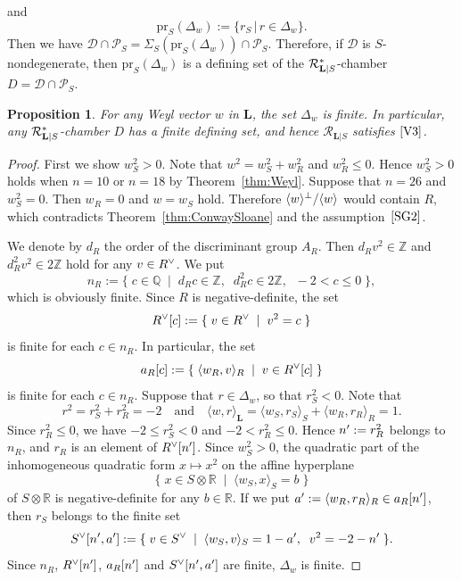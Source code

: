 \documentclass{amsart}
\theoremstyle{plain}
\newtheorem{proposition}[theorem]{Proposition}
\theoremstyle{definition}
\theoremstyle{remark}
\numberwithin{equation}{section}
\numberwithin{table}{section}
\numberwithin{figure}{section}
\newcommand{\Q}{\mathord{\mathbb  Q}}
\newcommand{\R}{\mathord{\mathbb R}}
\newcommand{\Z}{\mathord{\mathbb Z}}
\newcommand{\DDD}{\mathord{\mathcal D}}
\newcommand{\PPP}{\mathord{\mathcal P}}
\newcommand{\RRR}{\mathord{\mathcal R}}
\newcommand{\set}[2]{\{\; {#1} \; \mid \; {#2} \;  \}}
\newcommand{\shortset}[2]{\{ {#1} \,|\, {#2}   \}}
\newcommand{\gen}[1]{\langle {#1}  \rangle}
\newcommand{\tensor}{\otimes}
\newcommand{\sprime}{\sp\prime}
\newcommand{\sperp}{\sp{\perp}}
\newcommand{\dual}{\sp{\vee}}
\newcommand{\pr}{\mathord{\mathrm {pr}}}
\newcommand{\rmand}{\textrm{and}}
\newcommand{\quand}{\quad\rmand\quad}
\renewcommand{\L}{\mathord{\mathbf{L}}}
\newcommand{\intM}[2]{\langle{#1}\rangle_{#2}}
\newcommand{\Roots}{\RRR}
\newcommand{\sphyp}{\sp*}
\newcommand{\RtsLS}{\Roots_{\L|S}}
\newcommand{\propVthree}{\mathord{\rm [V3]}}
\newcommand{\assumptwo}{\mathord{\rm [SG2]}}
\begin{document}
%
and
\begin{equation} 
\pr_{S}(\Delta_w):=\shortset{r_S}{r\in\Delta_{w}}.
\end{equation}
%
Then
we have $\DDD\cap\PPP_S=\Sigma_{S} (\pr_S(\Delta_w))\cap \PPP_S$.
Therefore, if $\DDD$ is $S$-nondegenerate, then $\pr_{S}(\Delta_w)$ is a defining set of 
the $\RtsLS\sphyp$-chamber $D=\DDD\cap\PPP_S$.
%
%
\begin{proposition}\label{prop:proerty_c}
For any Weyl vector $w$ in $\L$, the set $\Delta_{w}$ is finite.
In particular, any $\RtsLS\sphyp$-chamber $D$ has a finite defining set,
and hence $\RtsLS$ satisfies $\propVthree$.
\end{proposition}
%
\begin{proof}
First we show  $w_S^2>0$.
Note that
$w^2=w_S^2+w_R^2$ and $w_R^2\le 0$.
Hence $w_S^2>0$ holds when $n=10$ or $n=18$
by Theorem~\ref{thm:Weyl}.
Suppose that $n=26$ and $w_S^2=0$.
Then $w_R=0$ and $w=w_S$ hold.
Therefore $\gen{w}\sperp/\gen{w}$ would contain $R$,
which contradicts Theorem~\ref{thm:ConwaySloane} and the assumption~$\assumptwo$. 
%
\par
We denote by $d_R$ the order of the discriminant group $A_R$.
Then $d_Rv^2\in \Z$ and $d_R^2v^2\in2\Z$ hold for any $v\in R\dual$.
We put
%
\begin{equation}\label{eq:nR}
n_R:=\set{c\in \Q}{d_Rc\in \Z, \;\;d_R^2c\in 2\Z, \;\; -2< c\le 0},
\end{equation}
%
which is obviously finite.
Since $R$ is negative-definite, 
the set 
%
\begin{equation}\label{eq:Rdualc}
R\dual[c]:=\set{v\in R\dual}{v^2=c}
\end{equation}
%
is finite for each $c\in n_R$.
In particular, the set
%
\begin{equation}\label{eq:aRc}
a_R[c]:=\set{\intM{w_R, v}{R}}{v\in R\dual[c]}
\end{equation}
%
is finite for each $c\in n_R$. 
Suppose that $r\in\Delta_w$,  so that $r_S^2<0$.
Note that 
$$
r^2=r_S^2+r_R^2=-2\quand \intM{w, r}{{\L}}=\intM{w_S, r_S}{S}+\intM{w_R, r_R}{R}=1.
$$
Since $r_R^2\le 0$,
we have $-2\le r_S^2<0$ and $-2<r_R^2\le 0$.
Hence $n\sprime:=r_R^2$ belongs to  $n_R$,
and $r_R$ is an element of  $R\dual[n\sprime]$.
Since $w_S^2>0$,
the quadratic part of the inhomogeneous quadratic form $x\mapsto x^2$ on the affine hyperplane
$$
\set{x\in S\tensor\R}{\intM{w_S, x}{S}=b}
$$
of $S\tensor\R$
is negative-definite for any $b\in \R$.
 If we put $a\sprime:=\intM{w_R, r_R}{R} \in a_R[n\sprime]$, then  $r_S$ belongs to 
 the finite set
%
\begin{equation}\label{eq:Sdualna}
S\dual[n\sprime, a\sprime]:=\set{v\in S\dual}{\intM{w_S, v}{S}=1-a\sprime,\;\; v^2=-2-n\sprime}.
\end{equation}
Since $n_R$, $R\dual[n\sprime]$, $a_R[n\sprime]$  and $S\dual[n\sprime, a\sprime]$ are finite,
$\Delta_{w}$ is finite.
\end{proof}
\end{document}
